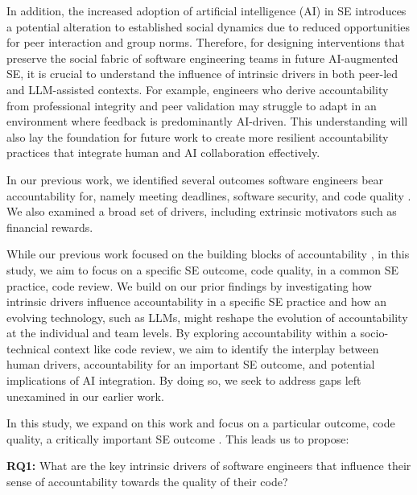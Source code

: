In addition, the increased adoption of artificial intelligence (AI) in SE \citep{fan2023large} introduces a potential alteration to established social dynamics due to reduced opportunities for peer interaction and group norms. Therefore, for designing interventions that preserve the social fabric of software engineering teams in future AI-augmented SE, it is crucial to understand the influence of intrinsic drivers in both peer-led and LLM-assisted contexts. For example, engineers who derive accountability from professional integrity and peer validation may struggle to adapt in an environment where feedback is predominantly AI-driven. This understanding will also lay the foundation for future work to create more resilient accountability practices that integrate human and AI collaboration effectively.

In our previous work, we identified several outcomes software engineers bear accountability for, namely meeting deadlines, software security, and code quality \citep{alami2024understanding}. We also examined a broad set of drivers, including extrinsic motivators such as financial rewards. 

While our previous work focused on the building blocks of accountability \citep{alami2024understanding}, in this study, we aim to focus on a specific SE outcome, code quality, in a common SE practice, code review. We build on our prior findings by investigating how intrinsic drivers influence accountability in a specific SE practice and how an evolving technology, such as LLMs, might reshape the evolution of accountability at the individual and team levels. By exploring accountability within a socio-technical context like code review, we aim to identify the interplay between human drivers, accountability for an important SE outcome, and potential implications of AI integration. By doing so, we seek to address gaps left unexamined in our earlier work.

In this study, we expand on this work and focus on a particular outcome, code quality, a critically important SE outcome \citep{alami2022scrum,vasilescu2015quality}. This leads us to propose:

\medskip
    
    \noindent \textbf{RQ1:} What are the key intrinsic drivers of software engineers that influence their sense of accountability towards the quality of their code?
    
\medskip

